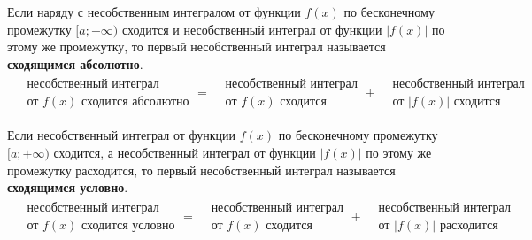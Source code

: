 \begin{definition}
    Если наряду с несобственным интегралом от функции $f(x)$ по бесконечному промежутку $[a;+\infty)$ сходится и несобственный интеграл от функции $|f(x)|$ по этому же промежутку, то первый несобственный интеграл называется \textbf{сходящимся абсолютно}.
    \begin{gather*}
        \boxed{\begin{aligned}
            &\text{несобственный интеграл} \\
            &\text{от $f(x)$ сходится абсолютно} 
        \end{aligned}} = \boxed{\begin{aligned}
            &\text{несобственный интеграл}  \\
            &\text{от $f(x)$ сходится}
        \end{aligned}} + \boxed{\begin{aligned}
            &\text{несобственный интеграл} \\
            &\text{от $|f(x)|$ сходится}
        \end{aligned}}
    \end{gather*}
\end{definition}

\begin{definition}
    Если несобственный интеграл от функции $f(x)$ по бесконечному промежутку $[a;+\infty)$ сходится, а несобственный интеграл от функции $|f(x)|$ по этому же промежутку расходится, то первый несобственный интеграл называется \textbf{сходящимся условно}.
    \begin{gather*}
        \boxed{\begin{aligned}
                &\text{несобственный интеграл} \\
                &\text{от $f(x)$ сходится условно} 
            \end{aligned}} = \boxed{\begin{aligned}
                &\text{несобственный интеграл}  \\
                &\text{от $f(x)$ сходится}
            \end{aligned}} + \boxed{\begin{aligned}
                &\text{несобственный интеграл} \\
                &\text{от $|f(x)|$ расходится}
            \end{aligned}}
    \end{gather*}
\end{definition}

